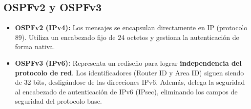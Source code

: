 \subsection{OSPFv2 y OSPFv3}

\begin{itemize}
    \item \textbf{OSPFv2 (IPv4):} Los mensajes se encapsulan directamente en IP (protocolo 89). Utiliza un encabezado fijo de 24 octetos y gestiona la autenticación de forma nativa.
    \item \textbf{OSPFv3 (IPv6):} Representa un rediseño para lograr \textbf{independencia del protocolo de red}. Los identificadores (Router ID y Area ID) siguen siendo de 32 bits, desligándose de las direcciones IPv6. Además, delega la seguridad al encabezado de autenticación de IPv6 (IPsec), eliminando los campos de seguridad del protocolo base.
\end{itemize}

